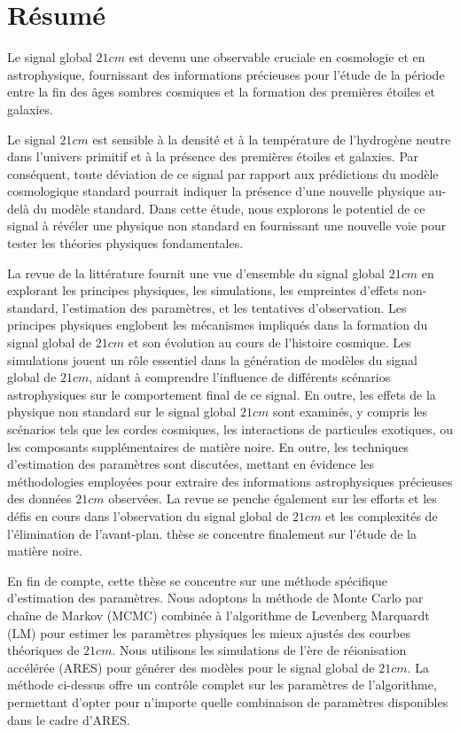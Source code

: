 \documentclass[12pt, TexShade, letterpaper]{report}
\begin{document}
\chapter*{Résumé}
	\label{chap:frAbstract}
Le signal global $21cm$ est devenu une observable cruciale en cosmologie et en astrophysique, fournissant des informations précieuses pour l'étude de la période entre la fin des âges sombres cosmiques et la formation des premières étoiles et galaxies.\par

Le signal $21cm$ est sensible à la densité et à la température de l'hydrogène neutre dans l'univers primitif et à la présence des premières étoiles et galaxies. Par conséquent, toute déviation de ce signal par rapport aux prédictions du modèle cosmologique standard pourrait indiquer la présence d'une nouvelle physique au-delà du modèle standard. Dans cette étude, nous explorons le potentiel de ce signal à révéler une physique non standard en fournissant une nouvelle voie pour tester les théories physiques fondamentales. \par

La revue de la littérature fournit une vue d'ensemble du signal global $21cm$ en explorant les principes physiques, les simulations, les empreintes d'effets non-standard, l'estimation des paramètres, et les tentatives d'observation. Les principes physiques englobent les mécanismes impliqués dans la formation du signal global de $21cm$ et son évolution au cours de l'histoire cosmique. Les simulations jouent un rôle essentiel dans la génération de modèles du signal global de $21cm$, aidant à comprendre l'influence de différents scénarios astrophysiques sur le comportement final de ce signal. En outre, les effets de la physique non standard sur le signal global $21cm$ sont examinés, y compris les scénarios tels que les cordes cosmiques, les interactions de particules exotiques, ou les composants supplémentaires de matière noire. En outre, les techniques d'estimation des paramètres sont discutées, mettant en évidence les méthodologies employées pour extraire des informations astrophysiques précieuses des données $21cm$ observées. La revue se penche également sur les efforts et les défis en cours dans l'observation du signal global de $21cm$ et les complexités de l'élimination de l'avant-plan. thèse se concentre finalement sur l'étude de la matière noire.\par

En fin de compte, cette thèse se concentre sur une méthode spécifique d'estimation des paramètres. Nous adoptons la méthode de Monte Carlo par chaîne de Markov (MCMC) combinée à l'algorithme de Levenberg Marquardt (LM) pour estimer les paramètres physiques les mieux ajustés des courbes théoriques de $21cm$. Nous utilisons les simulations de l'ère de réionisation accélérée (ARES) pour générer des modèles pour le signal global de $21cm$. La méthode ci-dessus offre un contrôle complet sur les paramètres de l'algorithme, permettant d'opter pour n'importe quelle combinaison de paramètres disponibles dans le cadre d'ARES.\par
\end{document}
